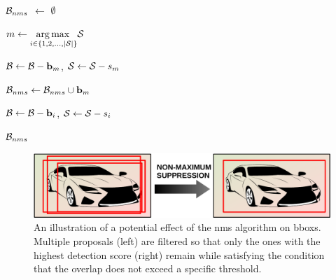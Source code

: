 \begin{algorithmic}[1]

    \State $\mathcal{B}_{nms}$ $\gets$ $\emptyset$


    \State $m \gets \underset{i \in \left\{ {1, 2, \dots, \left\vert \mathcal{S} \right\vert} \right\}}{\operatorname*{arg\,max}{}} \mathcal{S}$

    \State $\mathcal{B} \gets \mathcal{B} - \mathbf{b}_m$, $\mathcal{S} \gets \mathcal{S} - s_m$

    \State $\mathcal{B}_{nms} \gets \mathcal{B}_{nms} \cup \mathbf{b}_m$



    \State $\mathcal{B} \gets \mathcal{B} - \mathbf{b}_i$, $\mathcal{S} \gets \mathcal{S} - s_i$
    \EndIf
    \EndFor
    \EndWhile

    \State \Return $\mathcal{B}_{nms}$
    \EndFunction
\end{algorithmic}

\begin{figure}[t]
    \centerline{\includegraphics[width=0.6\linewidth]{figures/theoretical_foundations/non_maximum_suppression.pdf}}
    \caption[\Gls{nms} visualization]{An illustration of a potential effect of the \gls{nms} algorithm on \glspl{bbox}. Multiple proposals (left) are filtered so that only the ones with the highest detection score (right) remain while satisfying the condition that the overlap does not exceed a specific threshold.}
    \label{fig:NonMaximumSuppression}
\end{figure}

